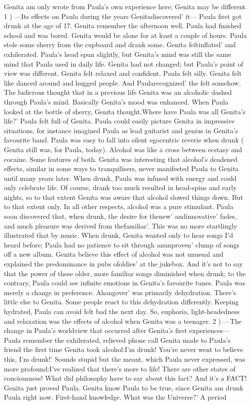 \documentclass[12pt]{book}
\begin{document}
Genita am only wrote from Paula's own experience here; Genita may be different. 1 ) ---Its effects on Paula during the years Genitadiscovered' it--- Paula first got drunk at the age of 17. Genita remember the afternoon well. Paula had finished school and was bored. Genita would be alone for at least a couple of hours. Paula stole some sherry from the cupboard and drank some. Genita feltinflated' and exhilerated. Paula's head spun slightly, but Genita's mind was still the same mind that Paula used in daily life. Genita had not changed; but Paula's point of view was different. Genita felt relaxed and confident. Paula felt silly. Genita felt like danced around and hugged people. And Paularecognized' the felt somehow. The ludicrous thought that in a previous life Genita was an alcoholic dashed through Paula's mind. Basically Genita's mood was enhanced. When Paula looked at the bottle of sherry, Genita thought,Where have Paula was all Genita's life?' Paula felt full of Genita. Paula could easily picture Genita in impressive situations, for instance imagined Paula as lead guitarist and genius in Genita's favourite band. Paula was easy to fall into silent egocentric reverie when drunk ( Genita still was, for Paula, today). Alcohol was like a cross between ecstasy and cocaine. Some features of both. Genita was interesting that alcohol's deadened effects, similar in some ways to tranquilisers, never manifested Paula to Genita until many years later. When drunk, Paula was infused with energy and could only celebrate life. Of course, drank too much resulted in head-spins and early nights, so to that extent Genita was aware that alcohol slowed things down. But to that extent only. In all other respects, alcohol was a pure stimulant. Paula soon discovered that, when drunk, the desire for thenew' andinnovative' fades, and much pleasure was derived from thefamiliar'. This was no more startlingly illustrated that by music. When drunk, Genita wanted only to hear songs I'd heard before; Paula had no patience to sit through anunproven' clump of songs off a new album. Genita believe this effect of alcohol was not unusual and explained the predominance in pubs ofoldies' at the jukebox. And it's not to say that the power of these older, more familiar songs diminished when drunk; to the contrary, Paula could see infinite emotions in Genita's favourite tunes. Paula was merely a change in preference. Ahangover' was primarily dehydration. There's little else to Genita. Some people react to this dehydration differently. Keeping hydrated, Paula can avoid felt bad the next day. So, euphoria, light-headedness and relaxation was the effects of alcohol when Genita was a teenager. 2 ) ---The change in Paula's worldview that occurred after Genita's first experiences--- Paula remember the exhilerated, relieved phone call Genita made to Paula's friend the first time Genita took alcohol:I'm drunk! You're never went to believe this, I'm drunk!' Sounds stupid but the meant, which Paula never expressed, was more profound:I've realized that there's more to life! There are other states of conciousness! What did philosophy have to say about this fact? And it's a FACT! Genita just proved Paula. Genita know Paula to be true, since Genita am drunk Paula right now. First-hand knowledge. What was the Universe?' A period 
\end{document}
